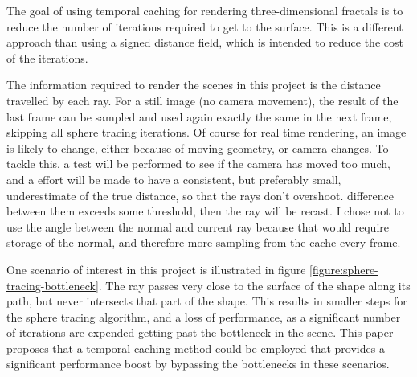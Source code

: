 The goal of using temporal caching for rendering three-dimensional fractals is to reduce the number of iterations required to get to the surface. This is a different approach than using a signed distance field, which is intended to reduce the cost of the iterations.\newline

The information required to render the scenes in this project is the distance travelled by each ray. For a still image (no camera movement), the result of the last frame can be sampled and used again exactly the same in the next frame, skipping all sphere tracing iterations. Of course for real time rendering, an image is likely to change, either because of moving geometry, or camera changes. To tackle this, a test will be performed to see if the camera has moved too much, and a effort will be made to have a consistent, but preferably small, underestimate of the true distance, so that the rays don't overshoot. difference between them exceeds some threshold, then the ray will be recast. I chose not to use the angle between the normal and current ray because that would require storage of the normal, and therefore more sampling from the cache every frame.\newline

One scenario of interest in this project is illustrated in figure \ref{figure:sphere-tracing-bottleneck}. The ray passes very close to the surface of the shape along its path, but never intersects that part of the shape. This results in smaller steps for the sphere tracing algorithm, and a loss of performance, as a significant number of iterations are expended getting past the bottleneck in the scene. This paper proposes that a temporal caching method could be employed that provides a significant performance boost by bypassing the bottlenecks in these scenarios.